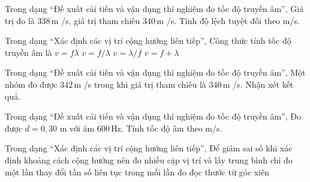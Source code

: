 \begin{ex}
Trong dạng “Đề xuất cải tiến và vận dụng thí nghiệm đo tốc độ truyền âm”, Giá trị đo là $338\,\text{m}$ /s, giá trị tham chiếu $340\,\text{m}$ /s. Tính độ lệch tuyệt đối theo m/s.
\end{ex}

\begin{ex}
Trong dạng “Xác định các vị trí cộng hưởng liên tiếp”, Công thức tính tốc độ truyền âm là
\choice
{\True $v=f\lambda$}
{$v=f/\lambda$}
{$v=\lambda/f$}
{$v=f+\lambda$}
\end{ex}

\begin{ex}
Trong dạng “Đề xuất cải tiến và vận dụng thí nghiệm đo tốc độ truyền âm”, Một nhóm đo được $342\,\text{m}$ /s trong khi giá trị tham chiếu là $340\,\text{m}$ /s. Nhận xét kết quả.
\choiceTF

\end{ex}

\begin{ex}
Trong dạng “Đề xuất cải tiến và vận dụng thí nghiệm đo tốc độ truyền âm”, Đo được $d=0,30$ m với âm $600\,\text{Hz}$. Tính tốc độ âm theo m/s.
\end{ex}

\begin{ex}
Trong dạng “Xác định các vị trí cộng hưởng liên tiếp”, Để giảm sai số khi xác định khoảng cách cộng hưởng nên
\choice
{\True đo nhiều cặp vị trí và lấy trung bình}
{chỉ đo một lần}
{thay đổi tần số liên tục trong mỗi lần đo}
{đọc thước từ góc xiên}
\end{ex}

